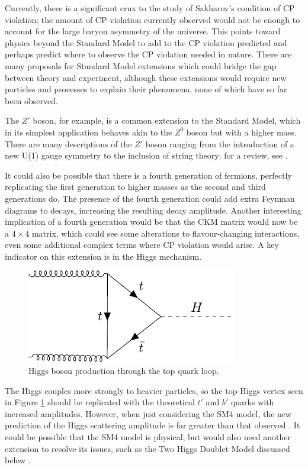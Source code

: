 \documentclass[a4paper,12pt]{article}
\begin{document}
Currently, there is a significant crux to the study of Sakharov's condition of CP violation: the amount of CP violation currently observed would not be enough to account for the large baryon asymmetry of the universe. 
This points toward physics beyond the Standard Model to add to the CP violation predicted and perhaps predict where to observe the CP violation needed in nature. 
There are many proposals for Standard Model extensions which could bridge the gap between theory and experiment, although these extensions would require new particles and processes to explain their phenomena, none of which have so far been observed. 

The $Z'$ boson, for example, is a common extension to the Standard Model, which in its simplest application behaves akin to the $Z^0$ boson but with a higher mass. 
There are many descriptions of the $Z'$ boson ranging from the introduction of a new U(1) gauge symmetry to the inclusion of string theory; for a review, see \cite{zp}. 

It could also be possible that there is a fourth generation of fermions, perfectly replicating the first generation to higher masses as the second and third generations do. 
The presence of the fourth generation could add extra Feynman diagrams to decays, increasing the resulting decay amplitude. 
Another interesting implication of a fourth generation would be that the CKM matrix would now be a $4\times4$ matrix, which could see some alterations to flavour-changing interactions, even some additional complex terms where CP violation would arise. 
A key indicator on this extension is in the Higgs mechanism. 
\begin{figure}[H]
    \centering
    \includegraphics{../notes/higgs.pdf}
    \caption{\label{fig:higgs} Higgs boson production through the top quark loop.}
\end{figure}
The Higgs couples more strongly to heavier particles, so the top-Higgs vertex seen in Figure \ref{fig:higgs} should be replicated with the theoretical $t'$ and $b'$ quarks with increased amplitudes. 
However, when just considering the SM4 model, the new prediction of the Higgs scattering amplitude is far greater than that observed \cite{sm4}. 
It could be possible that the SM4 model is physical, but would also need another extension to resolve its issues, such as the Two Higgs Doublet Model discussed below \cite{shal}. 
\end{document}
